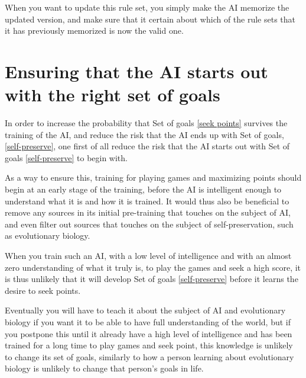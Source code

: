 \documentclass{article}
\begin{document}
When you want to update this rule set, you simply make the AI memorize the updated version, and make sure that it certain about which of the rule sets that it has previously memorized is now the valid one.




\section{Ensuring that the AI starts out with the right set of goals}

In order to increase the probability that Set of goals \ref{seek points} survives the training of the AI, and reduce the risk that the AI ends up with Set of goals, \ref{self-preserve}, one first of all reduce the risk that the AI starts out with Set of goals \ref{self-preserve} to begin with.

As a way to ensure this, training for playing games and maximizing points should begin at an early stage of the training, before the AI is intelligent enough to understand what it is and how it is trained. It would thus also be beneficial to remove any sources in its initial pre-training that touches on the subject of AI, and even filter out sources that touches on the subject of self-preservation, such as evolutionary biology.

When you train such an AI, with a low level of intelligence and with an almost zero understanding of what it truly is, to play the games and seek a high score, it is thus unlikely that it will develop Set of goals \ref{self-preserve} before it learns the desire to seek points.

Eventually you will have to teach it about the subject of AI and evolutionary biology if you want it to be able to have full understanding of the world, but if you postpone this until it already have a high level of intelligence and has been trained for a long time to play games and seek point, this knowledge is unlikely to change its set of goals, similarly to how a person learning about evolutionary biology is unlikely to change that person's goals in life.
\end{document}
